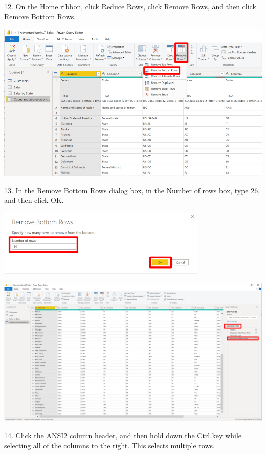 \documentclass[12pt,letterpaper]{article}
\begin{document}
12. On the Home ribbon, click Reduce Rows, click Remove Rows, and then click Remove Bottom Rows.
\begin{center}
    \includegraphics[width=15cm]{img/50.png}  
\end{center}
13. In the Remove Bottom Rows dialog box, in the Number of rows box, type 26, and then click OK.
\begin{center}
    \includegraphics[width=10cm]{img/51.png}  
\end{center}
\begin{center}
    \includegraphics[width=17cm]{img/52.png}  
\end{center}
14. Click the ANSI2 column header, and then hold down the Ctrl key while selecting all of the columns to the
right. This selects multiple rows.
\end{document}
